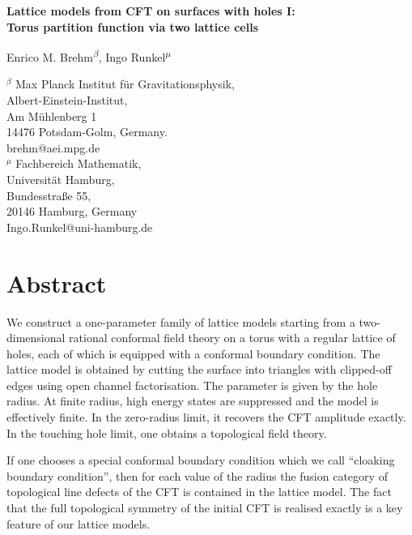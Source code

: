 \documentclass[11pt,a4paper]{article}
\numberwithin{equation}{section}
\begin{document}
 
\thispagestyle{empty}
\phantom{.}
\vspace{.7cm}
\begin{center}{\Large \textbf{
Lattice models from CFT on surfaces with holes I:\\[.5em]
Torus partition function via two lattice cells
}}
\end{center}

\begin{center}
Enrico M. Brehm\textsuperscript{$\beta$},
Ingo Runkel\textsuperscript{$\mu$}
\end{center}

\begin{center}
	{ ${}^{\beta}$} Max Planck Institut für Gravitationsphysik,\\
	Albert-Einstein-Institut, \\
	Am Mühlenberg 1 \\
	14476 Potsdam-Golm,	Germany.\\[.5em]
{\small \sf brehm@aei.mpg.de}
\\[1em]
	{${}^{\mu}$} 
Fachbereich Mathematik,\\
Universität Hamburg,\\
Bundesstraße 55,\\
20146 Hamburg, Germany\\[.5em]
{\small \sf Ingo.Runkel@uni-hamburg.de}
\end{center}

\section*{Abstract}

We construct a one-parameter family of lattice models starting from a two-dimensional rational conformal field theory on a torus with a regular lattice of holes, each of which is equipped with a conformal boundary condition. The lattice model is obtained by cutting the surface into triangles with clipped-off edges using open channel factorisation. The parameter is given by the hole radius. At finite radius,
high energy states are suppressed and the model is effectively finite. In the zero-radius limit, it recovers the CFT amplitude exactly. In the touching hole limit, one obtains a topological field theory. 

If one chooses a special conformal boundary condition which we call ``cloaking boundary condition'', then for each value of the radius the fusion category of topological line defects of the CFT is contained in the lattice model. 
The fact that the full topological symmetry of the initial CFT is realised exactly is a key feature of our lattice models.
\end{document}
